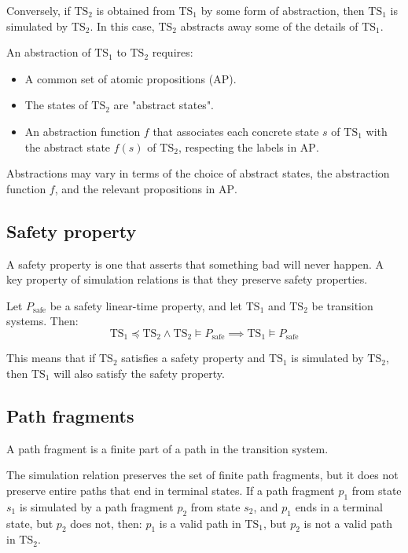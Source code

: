 \begin{definition}
    Conversely, if $\text{TS}_2$ is obtained from $\text{TS}_1$ by some form of abstraction, then $\text{TS}_1$ is simulated by $\text{TS}_2$.
    In this case, $\text{TS}_2$ abstracts away some of the details of $\text{TS}_1$.
\end{definition}
\noindent An abstraction of $\text{TS}_1$ to $\text{TS}_2$ requires:
\begin{itemize}
    \item A common set of atomic propositions (AP).
    \item The states of $\text{TS}_2$ are "abstract states".
    \item An abstraction function $f$ that associates each concrete state $s$ of $\text{TS}_1$ with the abstract state $f(s)$ of $\text{TS}_2$, respecting the labels in $\text{AP}$.
\end{itemize}
\noindent Abstractions may vary in terms of the choice of abstract states, the abstraction function $f$, and the relevant propositions in $\text{AP}$.




\subsection{Safety property}
A safety property is one that asserts that something bad will never happen. 
A key property of simulation relations is that they preserve safety properties.
\begin{property}
    Let $P_{\text{safe}}$ be a safety linear-time property, and let $\text{TS}_1$ and $\text{TS}_2$ be transition systems.
    Then:
    \[\text{TS}_1\preceq \text{TS}_2\land\text{TS}_2\models P_{\text{safe}}\implies\text{TS}_1\models P_{\text{safe}} \]
\end{property}
\noindent This means that if $\text{TS}_2$ satisfies a safety property and $\text{TS}_1$ is simulated by $\text{TS}_2$, then $\text{TS}_1$ will also satisfy the safety property.

\subsection{Path fragments}
\begin{definition}
    A path fragment is a finite part of a path in the transition system.
\end{definition}
\noindent The simulation relation preserves the set of finite path fragments, but it does not preserve entire paths that end in terminal states.
If a path fragment $p_1$ from state $s_1$ is simulated by a path fragment $p_2$ from state $s_2$, and $p_1$ ends in a terminal state, but $p_2$ does not, then: $p_1$ is a valid path in $\text{TS}_1$, but $p_2$ is not a valid path in  $\text{TS}_2$.

